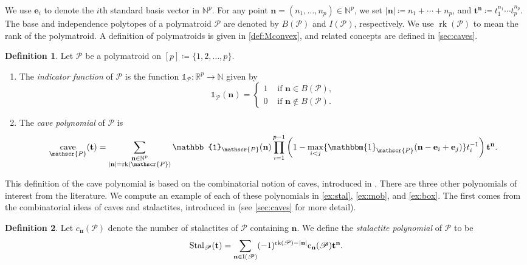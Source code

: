 \documentclass[a4paper, 11pt]{amsart}
\theoremstyle{definition}
\newtheorem{definition}[definition]{Definition}
\newcommand{\bfn}{\mathbf{n}}
\newcommand{\bft}{\mathbf{t}}
\newcommand{\bfe}{\mathbf{e}}
\newcommand{\sP}{\mathscr{P}}
\newcommand{\N}{\mathbb{N}}
\newcommand{\R}{\mathbb{R}}
\DeclareMathOperator{\rk}{rk}
\DeclareMathOperator{\cave}{cave}
\begin{document}
We use $\bfe_i$ to denote the $i$th standard basis vector in $\N^p$. For any point $\bfn = (n_1,\ldots,n_p) \in \N^p$, we set $|\bfn| \coloneqq n_1+\cdots + n_p$, and $\bft^\bfn \coloneqq t_1^{n_1}\cdots t_p^{n_p}$. The base and independence polytopes of a polymatroid $\sP$ are denoted by $B(\sP)$ and $I(\sP)$, respectively. We use $\rk(\sP)$ to mean the rank of the polymatroid. A definition of polymatroids is given in \autoref{def:Mconvex}, and related concepts are defined in \autoref{sec:caves}.  

\begin{definition} 
Let $\sP$ be a polymatroid on $[p]\coloneqq \{1,2, \ldots, p\}$. 
\begin{enumerate}
\item The \textit{indicator function} of $\sP$ is the function $\mathbb{1}_{\sP}\colon \R^p \to \N$ given by $$\mathbb{1}_{\sP}(\bfn) = \begin{cases}
    1 & \text{ if }\bfn\in B(\sP),\\
    0 & \text{ if }\bfn \notin B(\sP).
\end{cases}$$
\item The \textit{cave polynomial} of $\sP$ is 
$$\cave_{\sP}(\bft) = \sum_{\substack{\bfn \in \N^p \\ |\bfn| = \rk(\sP)}}\mathbb{1}_{\sP}(\bfn)\prod_{i=1}^{p-1}\left(1-\max_{i<j}\{\mathbbm{1}_{\sP}(\bfn-\bfe_i+\bfe_j)\}t_i^{-1}\right)\bft^\bfn.$$
\end{enumerate}
\end{definition}

This definition of the cave polynomial is based on the combinatorial notion of caves, introduced in \cite[Section 5]{CCRMM}. There are three other polynomials of interest from the literature. We  compute an example of each of these polynomials in \autoref{ex:stal}, \autoref{ex:mob}, and \autoref{ex:box}. The first comes from the combinatorial ideas of caves and stalactites, introduced in \cite{CCRMM} (see \autoref{sec:caves} for more detail). 
\begin{definition}\label{def:Stal} Let $c_{\bfn}(\sP)$ denote the number of stalactites of $\sP$ containing $\bfn$. We define the \textit{stalactite polynomial} of $\sP$ to be  
\[\rm{Stal}_{\sP}(\bft) = \sum_{\bfn \in I(\sP)}(-1)^{\rk(\sP)-|\bfn|}c_\bfn(\sP)\bft^\bfn.\]
\end{definition}

\end{document}
